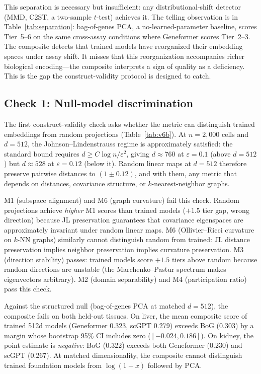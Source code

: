 \documentclass[10pt,letterpaper]{article}
\begin{document}
This separation is necessary but insufficient: any distributional-shift detector (MMD, C2ST, a two-sample $t$-test) achieves it. The telling observation is in Table~\ref{tab:separation}: bag-of-genes PCA, a no-learned-parameter baseline, scores Tier~5--6 on the same cross-assay conditions where Geneformer scores Tier~2--3. The composite detects that trained models have reorganized their embedding spaces under assay shift. It misses that this reorganization accompanies richer biological encoding---the composite interprets a sign of quality as a deficiency. This is the gap the construct-validity protocol is designed to catch.

\subsection{Check 1: Null-model discrimination}

The first construct-validity check asks whether the metric can distinguish trained embeddings from random projections (Table~\ref{tab:v6b}). At $n = 2{,}000$ cells and $d = 512$, the Johnson--Lindenstrauss regime is approximately satisfied: the standard bound requires $d \geq C \log n / \varepsilon^2$, giving $d \approx 760$ at $\varepsilon = 0.1$ (above $d = 512$) but $d \approx 528$ at $\varepsilon = 0.12$ (below it). Random linear maps at $d = 512$ therefore preserve pairwise distances to $(1 \pm 0.12)$, and with them, any metric that depends on distances, covariance structure, or $k$-nearest-neighbor graphs.

M1 (subspace alignment) and M6 (graph curvature) fail this check. Random projections achieve \emph{higher} M1 scores than trained models ($+1.5$ tier gap, wrong direction) because JL preservation guarantees that covariance eigenspaces are approximately invariant under random linear maps. M6 (Ollivier--Ricci curvature on $k$-NN graphs) similarly cannot distinguish random from trained: JL distance preservation implies neighbor preservation implies curvature preservation. M3 (direction stability) passes: trained models score $+1.5$ tiers above random because random directions are unstable (the Marchenko--Pastur spectrum makes eigenvectors arbitrary). M2 (domain separability) and M4 (participation ratio) pass this check.

Against the structured null (bag-of-genes PCA at matched $d = 512$), the composite fails on both held-out tissues. On liver, the mean composite score of trained 512d models (Geneformer 0.323, scGPT 0.279) exceeds BoG (0.303) by a margin whose bootstrap 95\% CI includes zero ($[-0.024, 0.186]$). On kidney, the point estimate is \emph{negative}: BoG (0.322) exceeds both Geneformer (0.230) and scGPT (0.267). At matched dimensionality, the composite cannot distinguish trained foundation models from $\log(1+x)$ followed by PCA.
\end{document}
